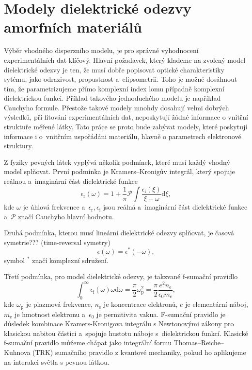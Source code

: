 \chapter{Modely dielektrické odezvy amorfních materiálů}

Výběr vhodného disperzního modelu, je pro správné vyhodnocení experimentálních dat klíčový. Hlavní požadavek, který klademe na zvolený model dielektrické odezvy je ten, že musí dobře popisovat optické charakteristiky sytému, jako odrazivost, propustnost a~elipsometrii. Toho je možné dosáhnout tím, že parametrizujeme přímo komplexní index lomu případně komplexní dielektrickou funkci. Příklad takového jednoduchého modelu je například Cauchyho formule. Přestože takové modely mnohdy dosahují velmi dobrých výsledků, při fitování experimentálních dat, neposkytují žádné informace o vnitřní struktuře měřené látky. Tato práce se proto bude zabývat modely, které poskytují informace i o~vnitřním uspořádáni materiálu, hlavně o parametrech elektronové struktury.

Z fyziky pevných látek vyplývá několik podmínek, které musí každý vhodný model splňovat. První podmínka je Kramers--Kronigův integrál, který spojuje reálnou a~ima\-gi\-nární část dielektrické funkce  
\begin{equation}
\epsilon_\mathrm{r}(\omega) = 1 + \frac{1}{\pi} \mathcal{P} \int \frac{\epsilon_\mathrm{i}(\xi)}{\xi - \omega} \mathrm{d}\xi \mathrm{,}
\label{KKint}
\end{equation}
kde $\omega$ je úhlová frekvence a~$\epsilon_\mathrm{r}, \epsilon_\mathrm{i}$ jsou reálná a~imaginární část dielektrické funkce a~$\mathcal{P}$ značí Cauchyho hlavní hodnotu. 

Druhá podmínka, kterou musí lineární dielektrické odezvy splňovat, je časová symetrie??? (time-reversal symetry)
\begin{equation}
\epsilon(\omega) =\epsilon^* (-\omega) \mathrm{,}
\label{casovasymetrie}
\end{equation}
symbol $^*$ značí komplexní sdružení.

Třetí podmínka, pro model dielektrické odezvy, je takzvané f-sumační pravidlo
\begin{equation}
\int_0^\infty \epsilon_\mathrm{i} (\omega) \omega \mathrm{d} \omega = \frac{\pi}{2} \omega_\mathrm{p}^2 = \frac{\pi}{2} \frac{e^2 n_\mathrm{e}}{ \epsilon_0 m_\mathrm{e}} \mathrm{,}
\end{equation}
kde $\omega_\mathrm{p}$ je plazmová frekvence, $n_\mathrm{e}$ je koncentrace elektronů, $e$ je elementární náboj, $m_\mathrm{e}$ je hmotnost elektronu a~$\epsilon_0$ je permitivita vakua. F-sumační pravidlo je důsledek kombinace Kramers-Kronigova integrálu s Newtonovými zákony pro klasickou nabitou částici a~spojuje hustotu náboje s~dielektrickou funkcí. Klasické f-sumační pravidlo můžeme chápat jako integrální formu Thomas--Reiche--Kuhnova (TRK) sumačního pravidlo z kvantové mechaniky, pokud ho aplikujeme na interakci světla s pevnou látkou.  

